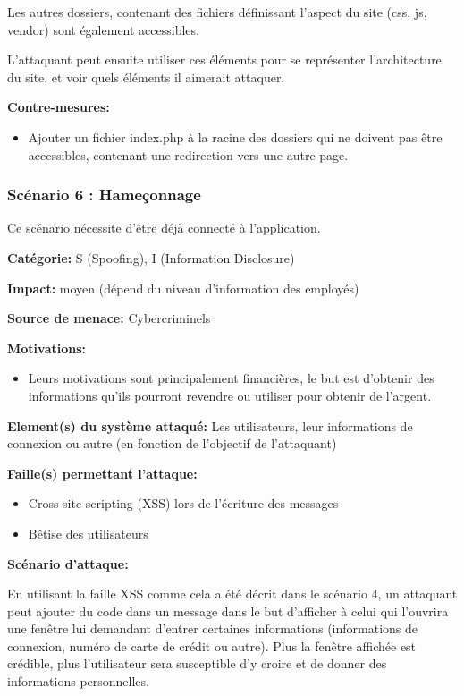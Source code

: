 \documentclass{article}
\begin{document}
Les autres dossiers, contenant des fichiers définissant l'aspect du site
(css, js, vendor) sont également accessibles.

L'attaquant peut ensuite utiliser ces éléments pour se représenter
l'architecture du site, et voir quels éléments il aimerait attaquer.

\textbf{Contre-mesures:}

\begin{itemize}

\item
  Ajouter un fichier index.php à la racine des dossiers qui ne doivent
  pas être accessibles, contenant une redirection vers une autre page.
\end{itemize}

\subsubsection{Scénario 6 : Hameçonnage}

Ce scénario nécessite d'être déjà connecté à l'application.

\textbf{Catégorie:} S (Spoofing), I (Information Disclosure)

\textbf{Impact:} moyen (dépend du niveau d'information des employés)

\textbf{Source de menace:} Cybercriminels

\textbf{Motivations:}

\begin{itemize}

\item
  Leurs motivations sont principalement financières, le but est
  d'obtenir des informations qu'ils pourront revendre ou utiliser pour
  obtenir de l'argent.
\end{itemize}

\textbf{Element(s) du système attaqué:} Les utilisateurs, leur
informations de connexion ou autre (en fonction de l'objectif de
l'attaquant)

\textbf{Faille(s) permettant l'attaque:}

\begin{itemize}

\item
  Cross-site scripting (XSS) lors de l'écriture des messages
\item
  Bêtise des utilisateurs
\end{itemize}

\textbf{Scénario d'attaque:}

En utilisant la faille XSS comme cela a été décrit dans le scénario 4,
un attaquant peut ajouter du code dans un message dans le but d'afficher
à celui qui l'ouvrira une fenêtre lui demandant d'entrer certaines
informations (informations de connexion, numéro de carte de crédit ou
autre). Plus la fenêtre affichée est crédible, plus l'utilisateur sera
susceptible d'y croire et de donner des informations personnelles.
\end{document}
